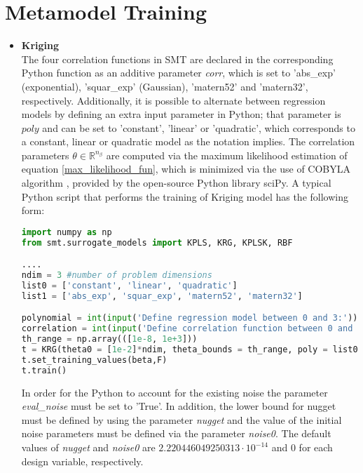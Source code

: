 \section{Metamodel Training}

\begin{itemize}
\item \textbf{Kriging} \\
The four correlation functions in SMT are declared in the 
corresponding Python function as an additive parameter 
\textit{corr}, which is set to 'abs\_exp' (exponential), 
'squar\_exp' (Gaussian), 'matern52' and 'matern32', respectively. 
Additionally, it is possible to alternate between regression models 
by defining an extra input parameter in Python; that parameter is 
$poly$ and can be set to 'constant', 'linear' or 'quadratic', which 
corresponds to a constant, linear or quadratic model as the 
notation implies. The correlation parameters $θ \!\in \!\mathbb{R}
^{n_{β}}$ are computed via the maximum likelihood estimation of 
equation \ref{max_likelihood_fun}, which is minimized via the use 
of COBYLA algorithm  \cite{COBYLA}, provided by the open-source 
Python library sciPy\cite{scipy}. A typical Python script that 
performs the training of Kriging model has the following form:

\begin{lstlisting}[language = Python, caption = Training of Kriging model with noise-free observations via SMT]
import numpy as np
from smt.surrogate_models import KPLS, KRG, KPLSK, RBF

.... 
ndim = 3 #number of problem dimensions
list0 = ['constant', 'linear', 'quadratic']
list1 = ['abs_exp', 'squar_exp', 'matern52', 'matern32']    

polynomial = int(input('Define regression model between 0 and 3:'))
correlation = int(input('Define correlation function between 0 and 4:'))
th_range = np.array(([1e-8, 1e+3]))
t = KRG(theta0 = [1e-2]*ndim, theta_bounds = th_range, poly = list0[polynomial], corr = list1[correlation], eval_noise = False)     
t.set_training_values(beta,F)
t.train()
\end{lstlisting}

In order for the Python to account for 
the existing noise the parameter \textit{eval\_noise} must be set 
to 'True'. In addition, the lower bound for nugget must be 
defined by using the parameter \textit{nugget} and the value 
of the initial noise parameters must be defined via the 
parameter \textit{noise0}. The default values of 
\textit{nugget} and \textit{noise0} are $2.220446049250313 
\cdot 10^{-14}$ and $0$ for each design variable, 
respectively.


\end{itemize}
